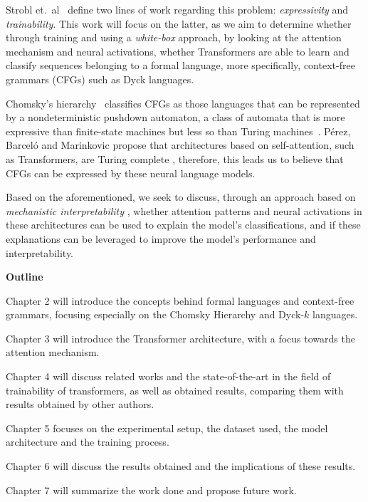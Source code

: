 Strobl et.\ al\ \cite{strobl2024formal} define two lines of work regarding this problem: \textit{expressivity} and \textit{trainability}. This work will focus on the latter, as we aim to determine whether through training and using a \textit{white-box} approach, by looking at the attention mechanism and neural activations, whether Transformers are able to learn and classify sequences belonging to a formal language, more specifically, context-free grammars (CFGs) such as Dyck languages.

Chomsky's hierarchy\ \cite{chomsky-hierarchy} classifies CFGs as those languages that can be represented by a nondeterministic pushdown automaton, a class of automata that is more expressive than finite-state machines but less so than Turing machines~\cite{context-free-chomsky}. Pérez, Barceló and Marinkovic propose that architectures based on self-attention, such as Transformers, are Turing complete \cite{attention-tc}, therefore, this leads us to believe that CFGs can be expressed by these neural language models.

Based on the aforementioned, we seek to discuss, through an approach based on \emph{mechanistic interpretability} \cite{mech_interp}, whether attention patterns and neural activations in these architectures can be used to explain the model's classifications, and if these explanations can be leveraged to improve the model's performance and interpretability.

\bigskip

\textbf{Outline}

Chapter 2 will introduce the concepts behind formal languages and context-free grammars, focusing especially on the Chomsky Hierarchy and Dyck-$k$ languages.

Chapter 3 will introduce the Transformer architecture, with a focus towards the attention mechanism.

Chapter 4 will discuss related works and the state-of-the-art in the field of trainability of transformers, as well as obtained results, comparing them with results obtained by other authors.

Chapter 5 focuses on the experimental setup, the dataset used, the model architecture and the training process.

Chapter 6 will discuss the results obtained and the implications of these results.

Chapter 7 will summarize the work done and propose future work.
